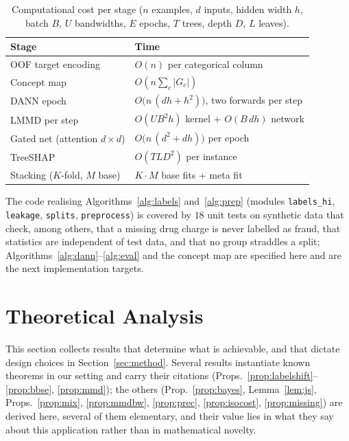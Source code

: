 \documentclass[journal]{IEEEtran}
\newcommand{\1}{\mathbf{1}}
\begin{document}
\begin{table}[t]
\centering
\caption{Computational cost per stage ($n$ examples, $d$ inputs, hidden width $h$, batch $B$, $U$ bandwidths, $E$ epochs, $T$ trees, depth $D$, $L$ leaves).}
\label{tab:complexity}
\small
\begin{tabular}{@{}ll@{}}
\toprule
Stage & Time \\
\midrule
OOF target encoding & $O(n)$ per categorical column \\
Concept map & $O(n\sum_c|G_c|)$ \\
DANN epoch & $O\big(n\,(dh+h^2)\big)$, two forwards per step \\
LMMD per step & $O(UB^2h)$ kernel + $O(B\,dh)$ network \\
Gated net (attention $d{\times}d$) & $O\big(n\,(d^2+dh)\big)$ per epoch \\
TreeSHAP & $O(TLD^2)$ per instance \\
Stacking ($K$-fold, $M$ base) & $K\cdot M$ base fits + meta fit \\
\bottomrule
\end{tabular}
\end{table}

\noindent The code realising Algorithms~\ref{alg:labels} and~\ref{alg:prep} (modules \texttt{labels\_hi}, \texttt{leakage}, \texttt{splits}, \texttt{preprocess}) is covered by $18$ unit tests on synthetic data that check, among others, that a missing drug charge is never labelled as fraud, that statistics are independent of test data, and that no group straddles a split; Algorithms~\ref{alg:dann}--\ref{alg:eval} and the concept map are specified here and are the next implementation targets.

\section{Theoretical Analysis}\label{sec:theory}
This section collects results that determine what is achievable, and that dictate design choices in Section~\ref{sec:method}. Several results instantiate known theorems in our setting and carry their citations (Props.~\ref{prop:labelshift}--\ref{prop:bbse}, \ref{prop:mmd}); the others (Prop.~\ref{prop:bayes}, Lemma~\ref{lem:js}, Props.~\ref{prop:mix}, \ref{prop:mmdbw}, \ref{prop:prec}, \ref{prop:isocost}, \ref{prop:missing}) are derived here, several of them elementary, and their value lies in what they say about this application rather than in mathematical novelty.
\end{document}
